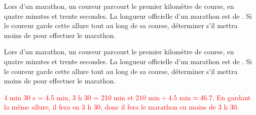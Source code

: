 \begin{exercice*}
    Lors d'un marathon, un coureur parcourt le premier kilomètre de course, en quatre minutes et trente secondes. La longueur officielle d'un
    marathon est de . Si le coureur garde cette allure tout au long de sa course, déterminer s'il mettra moins de  pour effectuer le marathon.
\end{exercice*}
\begin{corrige}
    Lors d'un marathon, un coureur parcourt le premier kilomètre de course, en quatre minutes et trente secondes. La longueur officielle d'un
    marathon est de . Si le coureur garde cette allure tout au long de sa course, déterminer s'il mettra moins de  pour effectuer le marathon.
    \par\textcolor{red}{%
    4 min 30 s = \num{4.5} min, 3 h 30 = 210 min et $210 \text{ min}\div \num{4.5}\text{ min} \simeq \num{46.7}$. En gardant la même allure, il fera  en 3 h 30, donc
    il fera le marathon en moins de 3 h 30.}
\end{corrige}


